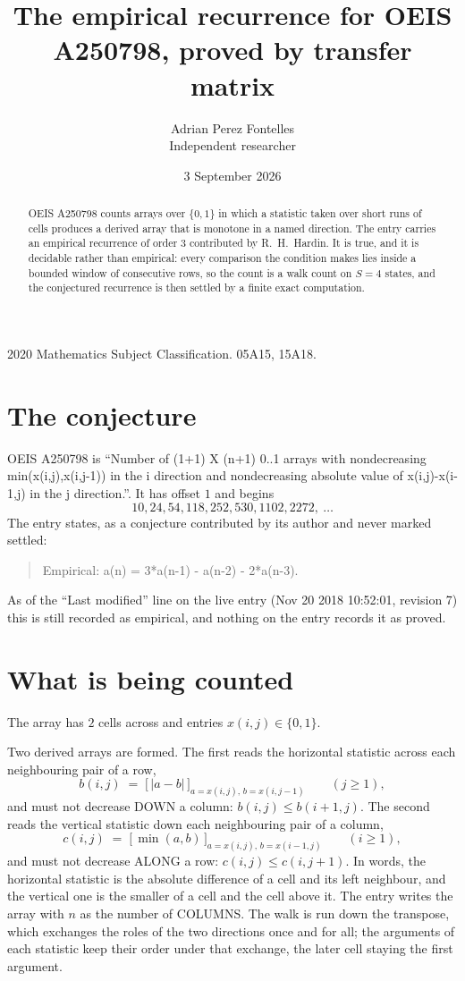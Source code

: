 \documentclass[11pt,a4paper]{article}
\title{The empirical recurrence for OEIS A250798, proved by transfer matrix}
\author{Adrian Perez Fontelles\\ \small Independent researcher}
\date{3 September 2026}
\theoremstyle{plain}
\theoremstyle{definition}
\begin{document}
\maketitle

\begin{abstract}
OEIS A250798 counts arrays over $\{0,1\}$ in which a statistic taken over short runs
of cells produces a derived array that is monotone in a named direction. The entry carries an
empirical recurrence of order $3$ contributed by R.~H.~Hardin. It is true, and it is
decidable rather than empirical: every comparison the condition makes lies inside a bounded
window of consecutive rows, so the count is a walk count on $S=4$ states, and the
conjectured recurrence is then settled by a finite exact computation.
\end{abstract}

\noindent\small 2020 Mathematics Subject Classification. 05A15, 15A18.\normalsize

\section{The conjecture}

OEIS A250798 is ``Number of (1+1) X (n+1) 0..1 arrays with nondecreasing min(x(i,j),x(i,j-1)) in the i direction and nondecreasing absolute value of x(i,j)-x(i-1,j) in the j direction.''. It has offset $1$ and begins
\[
10, 24, 54, 118, 252, 530, 1102, 2272,\ \dots
\]
The entry states, as a conjecture contributed by its author and never marked settled:
\begin{quote}
Empirical: a(n) = 3*a(n-1) - a(n-2) - 2*a(n-3).
\end{quote}
As of the ``Last modified'' line on the live entry (Nov 20 2018 10:52:01, revision 7) this is still
recorded as empirical, and nothing on the entry records it as proved.

\section{What is being counted}

The array has $2$ cells across and entries $x(i,j)\in\{0,1\}$.

Two derived arrays are formed. The first reads the horizontal statistic across each
neighbouring pair of a row,
\[
b(i,j)\;=\;\bigl[\,\lvert a-b\rvert\,\bigr]_{a=x(i,j),\,b=x(i,j-1)}\qquad (j\ge1),
\]
and must not decrease DOWN a column: $b(i,j)\le b(i{+}1,j)$. The second reads the vertical
statistic down each neighbouring pair of a column,
\[
c(i,j)\;=\;\bigl[\,\min(a,b)\,\bigr]_{a=x(i,j),\,b=x(i{-}1,j)}\qquad (i\ge1),
\]
and must not decrease ALONG a row: $c(i,j)\le c(i,j{+}1)$. In words, the horizontal statistic
is the absolute difference of a cell and its left neighbour, and the vertical one is
the smaller of a cell and the cell above it. The entry writes the array with $n$ as the number of COLUMNS. The walk is run down the transpose, which exchanges the roles of the two directions once and for all; the arguments of each statistic keep their order under that exchange, the later cell staying the first argument.
\end{document}
